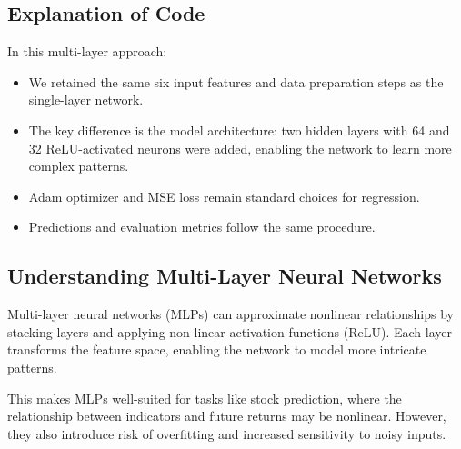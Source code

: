 \documentclass[12pt]{article}
\begin{document}
\subsection{Explanation of Code}
In this multi-layer approach:

\begin{itemize}
  \item We retained the same six input features and data preparation steps as the single-layer network.
  \item The key difference is the model architecture: two hidden layers with 64 and 32 ReLU-activated neurons were added, enabling the network to learn more complex patterns.
  \item Adam optimizer and MSE loss remain standard choices for regression.
  \item Predictions and evaluation metrics follow the same procedure.
\end{itemize}

\subsection{Understanding Multi-Layer Neural Networks}
Multi-layer neural networks (MLPs) can approximate nonlinear relationships by stacking layers and applying non-linear activation functions (ReLU). Each layer transforms the feature space, enabling the network to model more intricate patterns.

This makes MLPs well-suited for tasks like stock prediction, where the relationship between indicators and future returns may be nonlinear. However, they also introduce risk of overfitting and increased sensitivity to noisy inputs.
\end{document}
